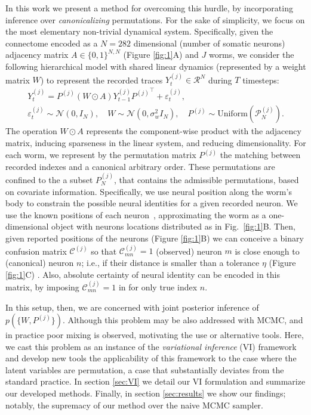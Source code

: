 \documentclass{article}
\begin{document}
In this work we present a method for overcoming this hurdle, by incorporating inference over \emph{canonicalizing} permutations. For the sake of simplicity, we focus on the most elementary non-trivial dynamical system. Specifically, given the connectome \citep{varshney2011structural} encoded as a $N=282$ dimensional (number of somatic neurons) adjacency matrix $A\in \{0,1\}^{N,N}$ (Figure \ref{fig:1}A) and $J$ worms, we consider the following hierarchical model with shared linear dynamics (represented by a weight matrix $W$) 
to represent the recorded traces $Y_t^{(j)}\in\mathcal{R}^N$ during $T$ timesteps: \begin{eqnarray}
\label{eq:generalmodel}
Y_t^{(j)}= P^{(j)}\left(W\odot A \right)Y^{(j)}_{t-1} {P^{(j)}}^\top+\varepsilon^{(j)}_t, \\ \nonumber
 \varepsilon^{(j)}_t\sim \mathcal{N}(0,I_N), \quad W\sim \mathcal{N}(0,\sigma_w^2 I_N), \quad P^{(j)}\sim\mathrm{Uniform}(\mathcal{P}^{(j)}_N).
 \end{eqnarray}
The operation $W\odot A$ represents the component-wise product with the adjacency matrix, inducing sparseness in the linear system, and reducing dimensionality. For each worm, we represent by the permutation matrix $P^{(j)}$ the matching between recorded indexes and a canonical arbitrary order. These permutations are confined to the a subset $P^{(j)}_N$, that contains the admissible permutations, based on covariate information. Specifically, we use neural position along the worm's body to constrain the
possible neural identities for a given recorded neuron.
We use the known positions of each neuron~\citep{wormatlas}, approximating
the worm as a one-dimensional object with neurons locations distributed
as in Fig.~\ref{fig:1}B. Then, given reported positions of the
neurons (Figure \ref{fig:1}B) we can conceive a binary confusion matrix
$\mathcal{C}^{(j)}$ so that $\mathcal{C}^{(j)}_{mn}=1$ (observed) neuron $m$ is close enough
to (canonical) neuron $n$; i.e., if their distance is smaller than a
tolerance $\eta$ (Figure \ref{fig:1}C) . Also, absolute certainty of neural identity can be encoded in this matrix, by imposing $\mathcal{C}^{(j)}_{mn}=1$ in for only true index $n$.

In this setup, then, we are concerned with joint posterior inference of $p(\{W,P^{(j)}\})$. Although this problem may be also addressed with MCMC, and in practice poor mixing is observed, motivating the use or alternative tools. Here, we cast this problem as an instance of the \emph{variational inference} (VI) framework \citep{Blei2017} and develop new tools the applicability of this framework to the case where the latent variables are permutation, a case that substantially deviates from the standard practice.  In section \ref{sec:VI} we detail our VI formulation and summarize our developed methods. Finally, in section \ref{sec:results} we show our findings; notably, the supremacy of our method over the naive MCMC sampler.
\end{document}
